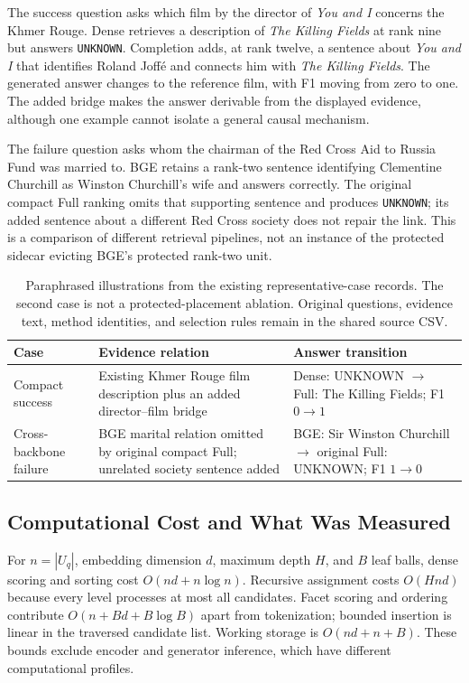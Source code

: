 \documentclass[11pt,a4paper]{article}
\begin{document}
The success question asks which film by the director of \emph{You and I}
concerns the Khmer Rouge. Dense retrieves a description of \emph{The Killing
Fields} at rank nine but answers \texttt{UNKNOWN}. Completion adds, at rank
twelve, a sentence about \emph{You and I} that identifies Roland Joff\'e and
connects him with \emph{The Killing Fields}. The generated answer changes to
the reference film, with F1 moving from zero to one.
The added bridge makes the answer derivable from the displayed evidence,
although one example cannot isolate a general causal mechanism.

The failure question asks whom the chairman of the Red Cross Aid to Russia
Fund was married to. BGE retains a rank-two sentence identifying Clementine
Churchill as Winston Churchill's wife and answers correctly. The original
compact Full ranking omits that supporting sentence and produces
\texttt{UNKNOWN}; its added sentence about a different Red Cross society
does not repair the link. This is a comparison of different retrieval
pipelines, not an instance of the protected sidecar evicting BGE's protected
rank-two unit.

\begin{table}[t]
\centering\small
\begin{tabular}{@{}p{}p{}p{}@{}}
\toprule
Case & Evidence relation & Answer transition\\
\midrule
Compact success & Existing Khmer Rouge film description plus an added
director--film bridge & Dense: UNKNOWN $\rightarrow$ Full: The Killing
Fields; F1 $0\rightarrow1$\\
Cross-backbone failure & BGE marital relation omitted by original compact
Full; unrelated society sentence added & BGE: Sir Winston Churchill
$\rightarrow$ original Full: UNKNOWN; F1 $1\rightarrow0$\\
\bottomrule
\end{tabular}
\caption{Paraphrased illustrations from the existing representative-case
records. The second case is not a protected-placement ablation. Original
questions, evidence text, method identities, and selection rules remain in
the shared source CSV.}
\label{tab:cases}
\end{table}

\subsection{Computational Cost and What Was Measured}
For $n=|U_q|$, embedding dimension $d$, maximum depth $H$, and $B$ leaf
balls, dense scoring and sorting cost $O(nd+n\log n)$. Recursive assignment
costs $O(Hnd)$ because every level processes at most all candidates.
Facet scoring and ordering contribute $O(n+Bd+B\log B)$ apart from
tokenization; bounded insertion is linear in the traversed candidate list.
Working storage is $O(nd+n+B)$. These bounds exclude encoder and generator
inference, which have different computational profiles.
\end{document}
